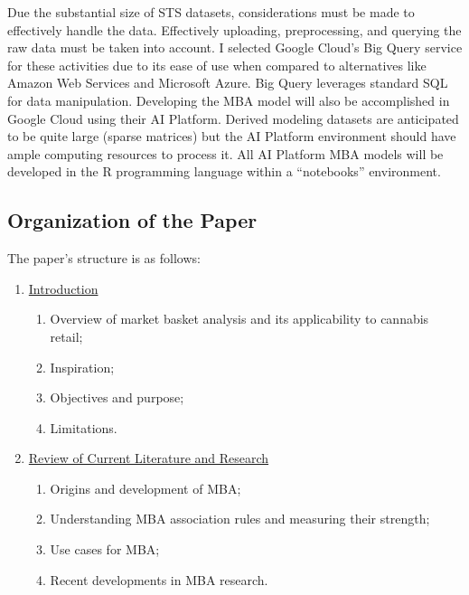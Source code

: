 \documentclass[../article.tex, 12pt]{subfiles}
\begin{document}
\begin{multicols*}{2}
Due the substantial size of STS datasets, considerations must be made to effectively handle the data. Effectively uploading, preprocessing, and querying the raw data must be taken into account. I selected Google Cloud's Big Query service for these activities due to its ease of use when compared to alternatives like Amazon Web Services and Microsoft Azure. Big Query leverages standard SQL for data manipulation. Developing the MBA model will also be accomplished in Google Cloud using their AI Platform. Derived modeling datasets are anticipated to be quite large (sparse matrices) but the AI Platform environment should have ample computing resources to process it. All AI Platform MBA models will be developed in the R programming language within a ``notebooks'' environment.

\subsection{Organization of the Paper}

The paper's structure is as follows:

{\hypersetup{linkcolor = black}
\begin{enumerate}

\item \hyperref[sec:introduction]{Introduction}

\begin{enumerate}
\item Overview of market basket analysis and its applicability to cannabis retail;
\item Inspiration;
\item Objectives and purpose;
\item Limitations.
\end{enumerate}

\item \hyperref[sec:literature-review]{Review of Current Literature and Research}

\begin{enumerate}
\item Origins and development of MBA;
\item Understanding MBA association rules and measuring their strength;
\item Use cases for MBA;
\item Recent developments in MBA research.
\end{enumerate}


\end{enumerate}}
\end{multicols*}
\end{document}
